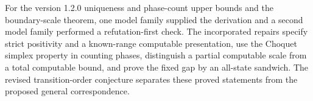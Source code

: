 For the version 1.2.0 uniqueness and phase-count upper bounds and the boundary-scale theorem, one model family supplied the derivation and a second model family performed a refutation-first check. The incorporated repairs specify strict positivity and a known-range computable presentation, use the Choquet simplex property in counting phases, distinguish a partial computable scale from a total computable bound, and prove the fixed gap by an all-state sandwich. The revised transition-order conjecture separates these proved statements from the proposed general correspondence.

